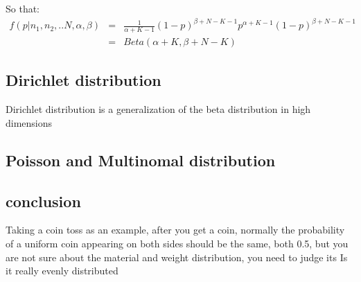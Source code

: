 So that:
\begin{eqnarray*}
  f(p|n_1,n_2,..N,\alpha,\beta) &=& \frac{1}{\alpha+K-1}(1-p)^{\beta+N-K-1}p^{\alpha+K-1}(1-p)^{\beta+N-K-1} \\
  &=& Beta(\alpha + K,\beta+N-K)
\end{eqnarray*}


\subsection{Dirichlet distribution}
Dirichlet distribution is a generalization of the beta distribution in high dimensions
\subsection{Poisson and Multinomal distribution}
\subsection{conclusion}
Taking a coin toss as an example, after you get a coin, normally the probability of a uniform coin appearing on both sides should be the same, both 0.5, but you are not sure about the material and weight distribution, you need to judge its Is it really evenly distributed
